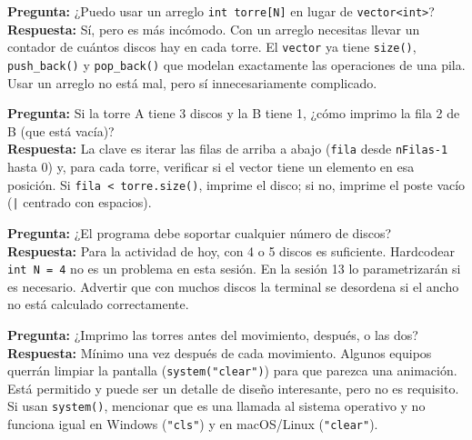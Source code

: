 \documentclass[12pt, oneside]{article}
\begin{document}
\begin{notaprofesor}
  \textbf{Pregunta:} ¿Puedo usar un arreglo \texttt{int torre[N]} en lugar
  de \texttt{vector<int>}?\\
  \textbf{Respuesta:} Sí, pero es más incómodo.  Con un arreglo necesitas
  llevar un contador de cuántos discos hay en cada torre.  El
  \texttt{vector} ya tiene \texttt{size()}, \texttt{push\_back()} y
  \texttt{pop\_back()} que modelan exactamente las operaciones de una pila.
  Usar un arreglo no está mal, pero sí innecesariamente complicado.
\end{notaprofesor}

\begin{notaprofesor}
  \textbf{Pregunta:} Si la torre A tiene 3 discos y la B tiene 1, ¿cómo
  imprimo la fila 2 de B (que está vacía)?\\
  \textbf{Respuesta:} La clave es iterar las filas de arriba a abajo
  (\texttt{fila} desde \texttt{nFilas-1} hasta 0) y, para cada torre,
  verificar si el vector tiene un elemento en esa posición.  Si
  \texttt{fila < torre.size()}, imprime el disco; si no, imprime el poste
  vacío (\texttt{|} centrado con espacios).
\end{notaprofesor}

\begin{notaprofesor}
  \textbf{Pregunta:} ¿El programa debe soportar cualquier número de discos?\\
  \textbf{Respuesta:} Para la actividad de hoy, con 4 o 5 discos es
  suficiente.  Hardcodear \texttt{int N = 4} no es un problema en esta
  sesión.  En la sesión 13 lo parametrizarán si es necesario.
  Advertir que con muchos discos la terminal se desordena si el ancho
  no está calculado correctamente.
\end{notaprofesor}

\begin{notaprofesor}
  \textbf{Pregunta:} ¿Imprimo las torres antes del movimiento, después, o las dos?\\
  \textbf{Respuesta:} Mínimo una vez después de cada movimiento.
  Algunos equipos querrán limpiar la pantalla (\texttt{system("clear")})
  para que parezca una animación.  Está permitido y puede ser un detalle
  de diseño interesante, pero no es requisito.  Si usan \texttt{system()},
  mencionar que es una llamada al sistema operativo y no funciona igual en
  Windows (\texttt{"cls"}) y en macOS/Linux (\texttt{"clear"}).
\end{notaprofesor}
\end{document}
